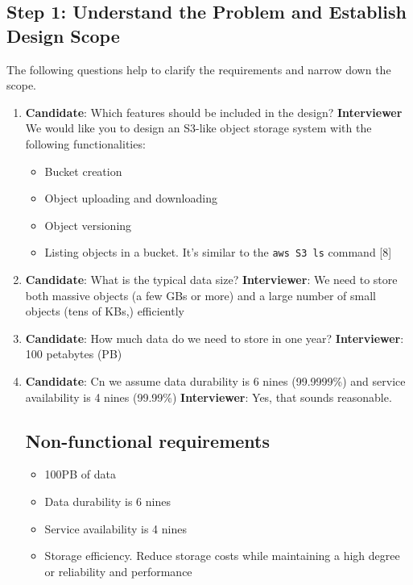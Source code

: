 \documentclass{report}
\theoremstyle{definition}
\let\oldsubsection\subsection
\renewcommand{\subsection}{\oldsubsection*}
\begin{document}
\subsection{Step 1: Understand the Problem and Establish Design Scope}

The following questions help to clarify the requirements and narrow down the scope.

\begin{enumerate}
\item

\textbf{Candidate}: Which features should be included in the design?
\textbf{Interviewer} We would like you to design an S3-like object storage system with the following functionalities:

\begin{itemize}
\item
Bucket creation
\item
Object uploading and downloading
\item
Object versioning
\item
Listing objects in a bucket. It's similar to the \lstinline|aws S3 ls| command [8]
\end{itemize}

\item
\textbf{Candidate}: What is the typical data size?
\textbf{Interviewer}: We need to store both massive objects (a few GBs or more) and a large number of small objects (tens of KBs,) efficiently

\item
\textbf{Candidate}: How much data do we need to store in one year?
\textbf{Interviewer}: 100 petabytes (PB)

\item
\textbf{Candidate}: Cn we assume data durability is 6 nines (99.9999\%) and service availability is 4 nines (99.99\%)
\textbf{Interviewer}: Yes, that sounds reasonable.

\subsection{Non-functional requirements}

\begin{itemize}
\item
100PB of data
\item
Data durability is 6 nines
\item
Service availability is 4 nines
\item
Storage efficiency. Reduce storage costs while maintaining a high degree or reliability and performance
\end{itemize}
\end{enumerate}
\end{document}
